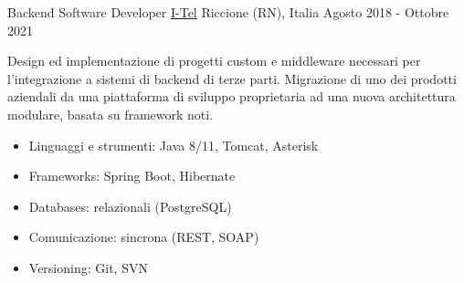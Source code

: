 \begin{cventries}

\cventry
    {Backend Software Developer} %
    {\href{https://i-tel.it}{I-Tel}} %
    {Riccione (RN), Italia} %
    {Agosto 2018 - Ottobre 2021} %
    {
      	Design ed implementazione di progetti custom e middleware necessari per l'integrazione a sistemi di backend di terze parti.
      	Migrazione di uno dei prodotti aziendali da una piattaforma di sviluppo proprietaria ad una nuova architettura modulare, basata su framework noti.
      	\begin{itemize}
      		\item {Linguaggi e strumenti: Java 8/11, Tomcat, Asterisk}
      		\item {Frameworks: Spring Boot, Hibernate}
      		\item {Databases: relazionali (PostgreSQL)}
      		\item {Comunicazione: sincrona (REST, SOAP)}
      		\item {Versioning: Git, SVN}
      	\end{itemize}
    }


\end{cventries}
